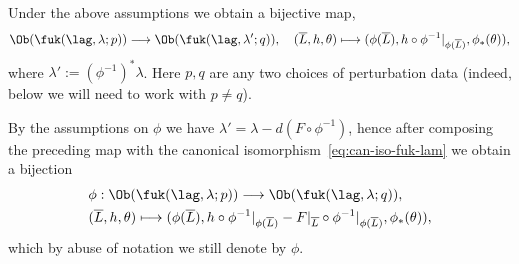 Under the above assumptions we obtain a bijective map,
\begin{equation} \label{eq:phi-obj-lam-1} \Ob(\fuk(\lag, \lambda; p))
  \longrightarrow \Ob(\fuk(\lag, \lambda';q)), \quad (\overline{L}, h,
  \theta) \longmapsto (\phi(\overline{L}), h \circ
  \phi^{-1}|_{\phi(\overline{L})}, \phi_*(\theta)),
\end{equation}
where $\lambda' := (\phi^{-1})^*\lambda$. Here $p,q$ are any two
choices of perturbation data (indeed, below we will need to work with
$p \neq q$).

By the assumptions on $\phi$ we have
$\lambda' = \lambda - d(F \circ \phi^{-1})$, hence after composing the
preceding map with the canonical
isomorphism~\eqref{eq:can-iso-fuk-lam} we obtain a bijection
\begin{equation} \label{eq:phi-obj}
  \begin{aligned}
    & \phi: \Ob(\fuk(\lag, \lambda;p)) \longrightarrow \Ob(\fuk(\lag,
    \lambda;q)),
    \\
    & (\overline{L}, h, \theta) \longmapsto (\phi(\overline{L}), h
    \circ \phi^{-1}|_{\phi(\overline{L})} - F|_{\overline{L}} \circ
    \phi^{-1}|_{\phi(\overline{L})}, \phi_*(\theta)),
  \end{aligned}
\end{equation}
which by abuse of notation we still denote by $\phi$.

